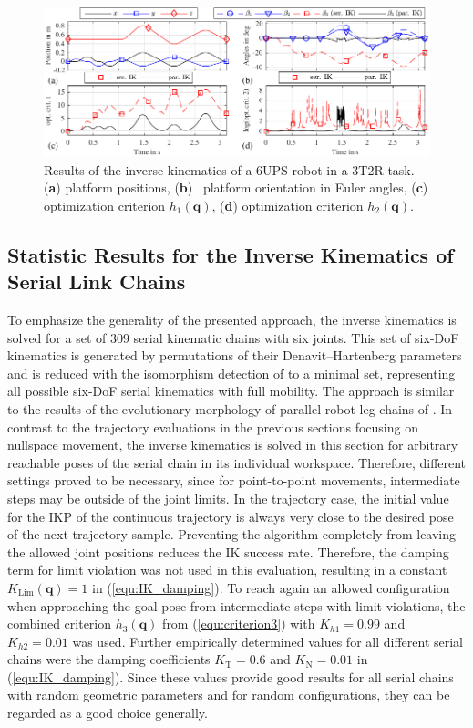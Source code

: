 \documentclass[robotics,article,accept,moreauthors,pdftex]{Definitions/mdpi}
\newcommand{\bm}[1]{\boldsymbol{#1}}
\begin{document}
%
\begin{figure}[b]
	\vspace{-0.5cm} %
	\includegraphics{parrob_traj_results1.pdf}
	\caption{Results of the inverse kinematics of a 6UPS robot in a 3T2R task. (\textbf{a}) platform positions, (\textbf{b})~ platform orientation in Euler angles, (\textbf{c}) optimization criterion $h_1(\bm{{q}})$, (\textbf{d}) optimization criterion $h_2(\bm{{q}})$.}
	\label{fig:parrob_traj_3T2R}
\end{figure} 


\subsection{Statistic Results for the Inverse Kinematics of Serial Link Chains}
\label{sec:Ergebnisse_IK_Statistik}

To emphasize the generality of the presented approach, the inverse kinematics is solved for a set of 309 serial kinematic chains with six joints.
This set of six-DoF kinematics is generated by permutations of their Denavit--Hartenberg parameters and is reduced with the isomorphism detection of \cite{RamirezKotOrt2015} to a minimal set, representing all possible six-DoF serial kinematics with full mobility.
The approach is similar to the results of the evolutionary morphology of parallel robot leg chains of \cite{Gogu2008}.
In contrast to the trajectory evaluations in the previous sections focusing on nullspace movement, the inverse kinematics is solved in this section for arbitrary reachable poses of the serial chain in its individual workspace.
Therefore, different settings proved to be necessary, since for point-to-point movements, intermediate steps may be outside of the joint limits.
In the trajectory case, the initial value for the IKP of the continuous trajectory is always very close to the desired pose of the next trajectory sample.
Preventing the algorithm completely from leaving the allowed joint positions reduces the IK success rate.
Therefore, the damping term for limit violation was not used in this evaluation, resulting in a constant $K_\mathrm{Lim}(\bm{q})=1$ in (\ref{equ:IK_damping}).
To reach again an allowed configuration when approaching the goal pose from intermediate steps with limit violations, the combined criterion $h_3(\bm{q})$ from (\ref{equ:criterion3}) with $K_{h1}=0.99$ and $K_{h2}=0.01$ was used.
Further empirically determined values for all different serial chains were the damping coefficients $K_{\mathrm{T}}=0.6$ and $K_{\mathrm{N}}=0.01$ in (\ref{equ:IK_damping}).
Since these values provide good results for all serial chains with random geometric parameters and for random configurations, they can be regarded as a good choice generally.
\end{document}
